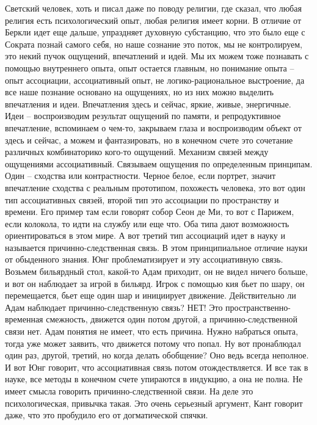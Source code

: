 \documentclass[a4paper, 12pt]{article}
\begin{document}
Светский человек, хоть и писал даже по поводу религии, где сказал, что 
любая религия есть психологический опыт, любая религия имеет корни. 
В отличие от Беркли идет еще дальше, упраздняет духовную субстанцию, что 
это было еще с Сократа познай самого себя, но наше сознание это поток, 
мы не контролируем, это некий пучок ощущений, впечатлений и идей. Мы их 
можем тоже познавать с помощью внутреннего опыта, опыт остается главным, 
но понимание опыта -- опыт ассоциации, ассоциативный опыт, не 
логико-рациональное выстроение, да все наше познание основано на 
ощущениях, но из них можно выделить впечатления и идеи. Впечатления 
здесь и сейчас, яркие, живые, энергичные. Идеи -- воспроизводим 
результат ощущений по памяти, и репродуктивное впечатление, вспоминаем 
о чем-то, закрываем глаза и воспроизводим объект от здесь и сейчас, 
а можем и фантазировать, но в конечном счете это сочетание различных 
комбинаторико кого-то ощущений. Механизм связей между ощущениями 
ассоциативный. Связываем ощущения по определенным принципам. Один -- 
сходства или контрастности. Черное белое, если портрет, значит 
впечатление сходства с реальным прототипом, похожесть человека, это вот 
один тип ассоциативных связей, второй тип это ассоциации по пространству 
и времени. Его пример там если говорят собор Сеон де Ми, то вот 
с Парижем, если колокола, то идти на службу или еще что. Оба типа дают 
возможность ориентироваться в этом мире. А вот третий тип ассоциаций 
идет в науку и называется причинно-следственная связь. В этом 
принципиальное отличие науки от обыденного знания. Юнг проблематизирует 
и эту ассоциативную связь. Возьмем бильярдный стол, какой-то Адам 
приходит, он не видел ничего больше, и вот он наблюдает за игрой 
в бильярд. Игрок с помощью кия бьет по шару, он перемещается, бьет еще 
один шар и инициирует движение. Действительно ли Адам наблюдает 
причинно-следственную связь? НЕТ! Это пространственно-временная 
смежность, движется один потом другой, а причинно-следственной связи 
нет. Адам понятия не имеет, что есть причина. Нужно набраться опыта, 
тогда уже может заявить, что движется потому что попал. Ну вот 
пронаблюдал один раз, другой, третий, но когда делать обобщение? Оно 
ведь всегда неполное. И вот Юнг говорит, что ассоциативная связь потом 
отождествляется. И все так в науке, все методы в конечном счете 
упираются в индукцию, а она не полна. Не имеет смысла говорить 
причинно-следственной связи. На деле это психологическая, привычка 
такая. Это очень серьезный аргумент, Кант говорит даже, что это 
пробудило его от догматической спячки.
\end{document}
